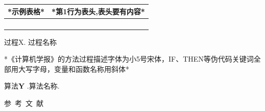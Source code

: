 \documentclass[10.5pt,compsoc]{CjC}
\theoremstyle{mystyle}
\begin{document}
\begin{table}[htbp]
\vspace {-2.5mm}
\begin{center}
\begin{tabular}{ll}
\toprule
*示例表格*&*第1行为表头,表头要有内容* \\
\hline
&
 \\
&
 \\
&
 \\
&
 \\
\bottomrule
\end{tabular}
\label{tab1}
\end{center}
\end{table}

\heiti 过程X. \quad 过程名称

{*《计算机学报》的方法过程描述字体为小5号宋体，IF、THEN等伪代码关键词全部用大写字母，变量和函数名称用斜体*}


\heiti 算法\textbf{Y} .\quad 算法名称.

\vspace {3mm}


\vspace {5mm}
\centerline
{
\heiti 参~考~文~献 }




\end{document}

